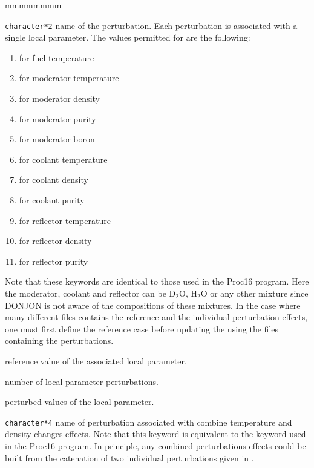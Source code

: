 \begin{ListeDeDescription}{mmmmmmmm}
\item[\dusa{NAMPER}] \texttt{character*2} name of the perturbation. Each perturbation is associated
with a single local parameter. The values permitted for
 are the following:
\begin{enumerate}
\item {} for fuel temperature
\item {} for moderator temperature
\item {} for moderator density
\item {} for moderator purity
\item {} for moderator boron
\item {} for coolant temperature
\item {} for coolant density
\item {} for coolant purity
\item {} for reflector temperature
\item {} for reflector density
\item {} for reflector purity
\end{enumerate}
Note that these keywords are identical to those used in the Proc16 program.\cite{Donnelly97a} Here the moderator,
coolant and reflector can be D$_2$O, H$_2$O or any other mixture since DONJON is not aware of the compositions of
these mixtures. In the case where many different  files contains the reference and the individual
perturbation effects, one must first define the reference case before updating the  using the 
files containing the perturbations.  

\item[\dusa{valref}] reference value of the associated local parameter.  

\item[\dusa{npert}]  number of local parameter perturbations. 

\item[\dusa{valper}] perturbed values of the local parameter.  

\item[\moc{MTMD}] \texttt{character*4} name of perturbation associated with combine temperature and density
changes effects. Note that this keyword is equivalent to the
 keyword used in the Proc16 program.\cite{Donnelly97a} In principle, any combined perturbations effects
could be built from the catenation of two individual perturbations given in . 


\end{ListeDeDescription}
